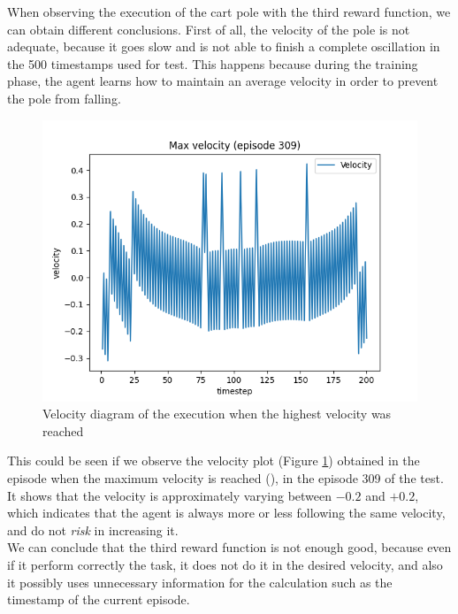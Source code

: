 \documentclass[12pt]{article}
\begin{document}
When observing the execution of the cart pole with the third reward function, we can obtain different conclusions. First of all, the velocity of the pole is not adequate, because it goes slow and is not able to finish a complete oscillation in the 500 timestamps used for test. This happens because during the training phase, the agent learns how to maintain an average velocity in order to prevent the pole from falling. \\

\begin{figure}[h]
    \centering
    \includegraphics[scale=0.45]{exercise-1/report/img/rewards/velocity-1.png}
    \caption{Velocity diagram of the execution when the highest velocity was reached}
    \label{fig:velocity}
\end{figure}

This could be seen if we observe the velocity plot (Figure \ref{fig:velocity}) obtained in the episode when the maximum velocity is reached (), in the episode 309 of the test. It shows that the velocity is approximately varying between $-0.2$ and $+0.2$, which indicates that the agent is always more or less following the same velocity, and do not \textit{risk} in increasing it. \\

We can conclude that the third reward function is not enough good, because even if it perform correctly the task, it does not do it in the desired velocity, and also it possibly uses unnecessary information for the calculation such as the timestamp of the current episode. 



\end{document}
